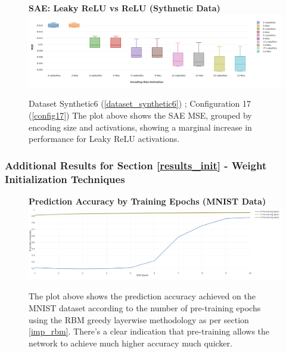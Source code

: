 \documentclass[a4paper,11pt,oneside]{article}
\theoremstyle{plain}
\theoremstyle{definition}
\begin{document}
\begin{figure}[H]
	\centering 
	\textbf{SAE: Leaky ReLU vs ReLU (Sythnetic Data)} 
	\includegraphics[scale=0.28]{images/results/activations/synthetic_mse_leakyrelu.png}
	\caption[SAE: Leaky ReLU vs ReLU (Sythnetic Data)]{Dataset Synthetic6  (\ref{dataset_synthetic6}) ; Configuration 17 (\ref{config17})
		\newline The plot above shows the SAE MSE, grouped by encoding size and activations, showing a marginal increase in performance for Leaky ReLU activations. }
	\label{figure-synthetic_mse_leakyrelu}
\end{figure}

\subsubsection{Additional Results for Section \ref{results_init} - Weight Initialization Techniques }\label{results_init_appendix}

\begin{figure}[H]
	\centering 
	\textbf{Prediction Accuracy by Training Epochs (MNIST Data)} 
	\includegraphics[scale=0.2]{images/results/newinit/rbm_pretraining.png}
	\caption[Prediction Accuracy by Training Epochs (MNIST Data)]{The plot above shows the prediction accuracy achieved on the MNIST dataset according to the number of pre-training epochs using the RBM greedy layerwise methodology as per section \ref{imp_rbm}. There's a clear indication that pre-training allows the network to achieve much higher accuracy much quicker.}
	\label{figure-rbm_pretraining}
\end{figure}
\end{document}
